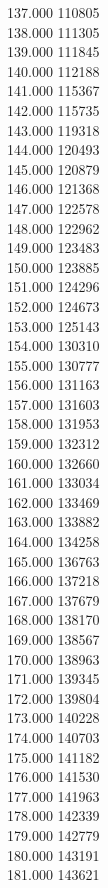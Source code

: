 { 137.000	110805 \\
 138.000	111305 \\
 139.000	111845 \\
 140.000	112188 \\
 141.000	115367 \\
 142.000	115735 \\
 143.000	119318 \\
 144.000	120493 \\
 145.000	120879 \\
 146.000	121368 \\
 147.000	122578 \\
 148.000	122962 \\
 149.000	123483 \\
 150.000	123885 \\
 151.000	124296 \\
 152.000	124673 \\
 153.000	125143 \\
 154.000	130310 \\
 155.000	130777 \\
 156.000	131163 \\
 157.000	131603 \\
 158.000	131953 \\
 159.000	132312 \\
 160.000	132660 \\
 161.000	133034 \\
 162.000	133469 \\
 163.000	133882 \\
 164.000	134258 \\
 165.000	136763 \\
 166.000	137218 \\
 167.000	137679 \\
 168.000	138170 \\
 169.000	138567 \\
 170.000	138963 \\
 171.000	139345 \\
 172.000	139804 \\
 173.000	140228 \\
 174.000	140703 \\
 175.000	141182 \\
 176.000	141530 \\
 177.000	141963 \\
 178.000	142339 \\
 179.000	142779 \\
 180.000	143191 \\
 181.000	143621 \\
}
